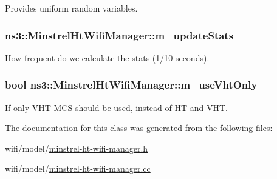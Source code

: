Provides uniform random variables. 

\subsubsection[{\texorpdfstring{m\+\_\+update\+Stats}{m_updateStats}}]{ ns3\+::\+Minstrel\+Ht\+Wifi\+Manager\+::m\+\_\+update\+Stats\hspace{0.3cm}{\ttfamily [private]}}\hypertarget{classns3_1_1MinstrelHtWifiManager_a5c7d923b77d5cd3a1d38810ed41f91f8}{}\label{classns3_1_1MinstrelHtWifiManager_a5c7d923b77d5cd3a1d38810ed41f91f8}


How frequent do we calculate the stats (1/10 seconds). 

\subsubsection[{\texorpdfstring{m\+\_\+use\+Vht\+Only}{m_useVhtOnly}}]{\setlength{\rightskip}{0pt plus 5cm}bool ns3\+::\+Minstrel\+Ht\+Wifi\+Manager\+::m\+\_\+use\+Vht\+Only\hspace{0.3cm}{\ttfamily [private]}}\hypertarget{classns3_1_1MinstrelHtWifiManager_a6997df6e5760dd9891f2caea0a6e1937}{}\label{classns3_1_1MinstrelHtWifiManager_a6997df6e5760dd9891f2caea0a6e1937}


If only V\+HT M\+CS should be used, instead of HT and V\+HT. 



The documentation for this class was generated from the following files\+:\begin{DoxyCompactItemize}
\item 
wifi/model/\hyperlink{minstrel-ht-wifi-manager_8h}{minstrel-\/ht-\/wifi-\/manager.\+h}\item 
wifi/model/\hyperlink{minstrel-ht-wifi-manager_8cc}{minstrel-\/ht-\/wifi-\/manager.\+cc}\end{DoxyCompactItemize}
